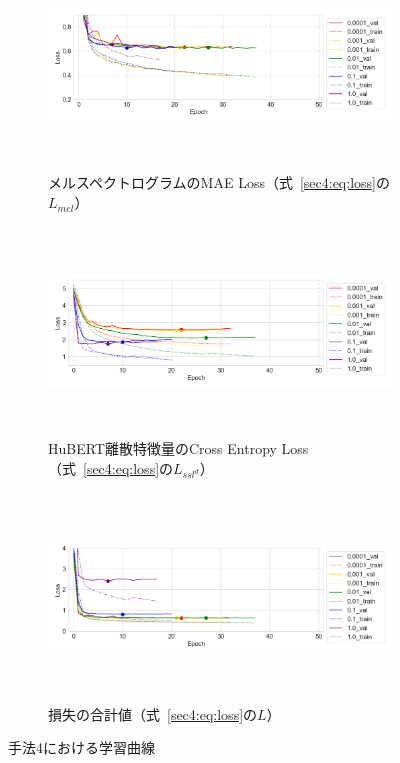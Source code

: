 \documentclass[12pt]{jarticle}
\numberwithin{equation}{section}    %
\numberwithin{figure}{section}      %
\numberwithin{table}{section}      %
\begin{document}
\begin{figure}[bt]
    \centering
    \begin{subfigure}{\linewidth}
        \centering
        \includegraphics[height=55mm]{./figure/sec4/learning_curves/4/mel_loss.png}
        \caption{メルスペクトログラムのMAE Loss（式~\eqref{sec4:eq:loss}の$L_{mel}$）}
        \label{sec4:fig:learning_curve_method_4_val_mel_loss}
    \end{subfigure}
    \begin{subfigure}{\linewidth}
        \centering
        \includegraphics[height=55mm]{./figure/sec4/learning_curves/4/ssl_feature_cluster_loss.png}
        \caption{HuBERT離散特徴量のCross Entropy Loss（式~\eqref{sec4:eq:loss}の$L_{ssl^{d}}$）}
        \label{sec4:fig:learning_curve_method_4_val_ssl_feature_cluster_loss}
    \end{subfigure}
    \begin{subfigure}{\linewidth}
        \centering
        \includegraphics[height=55mm]{./figure/sec4/learning_curves/4/total_loss.png}
        \caption{損失の合計値（式~\eqref{sec4:eq:loss}の$L$）}
        \label{sec4:fig:learning_curve_method_4_val_total_loss}
    \end{subfigure}
    \caption{手法4における学習曲線}
    \label{sec4:fig:learning_curve_method_4_val_losses}
\end{figure}
\end{document}
